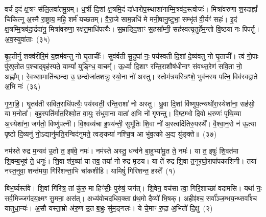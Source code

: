 वर्च॑ इ॒दं क्ष॒त्रꣳ स॑लि॒लवा॑तमु॒ग्रम्। ध॒र्त्री दि॒शां क्ष॒त्रमि॒दं दा॑धारोप॒स्थाशा॑नाम्मि॒त्रव॑द॒स्त्वोजः॑। मित्रा॑वरुणा श॒रदाह्नां᳚ चिकित्नू अ॒स्मै रा॒ष्ट्राय॒ महि॒ शर्म॑ यच्छतम्। वै॒रा॒जे साम॒न्नधि॑ मे मनी॒षानु॒ष्टुभा॒ सम्भृ॑तं वी॒र्यꣳ॑ सहः॑। इ॒दं क्ष॒त्रम्मि॒त्रव॑दा॒र्द्रदा॑नु॒ मित्रा॑वरुणा॒ रक्ष॑त॒माधि॑पत्यैः। स॒म्राड्दि॒शाꣳ स॒हसा᳚म्नी॒ सह॑स्वत्यृ॒तुर्\mbox{}हे॑म॒न्तो वि॒ष्ठया॑ नः पिपर्तु। अ॒व॒स्युवा॑ताः~(३५)

बृ॒ह॒तीर्नु शक्व॑रीरि॒मं य॒ज्ञम॑वन्तु नो घृ॒ताचीः᳚। सुव॑र्वती सु॒दुघा॑ नः॒ पय॑स्वती दि॒शां दे॒व्य॑वतु नो घृ॒ताची᳚। त्वं गो॒पाः पु॑रए॒तोत प॒श्चाद्बृह॑स्पते॒ याम्यां᳚ युङ्ग्धि॒ वाचम्᳚। ऊ॒र्ध्वा दि॒शाꣳ रन्ति॒राशौष॑धीनाꣳ संवथ्स॒रेण॑ सवि॒ता नो॒ अह्ना᳚म्। रे॒वथ्सामाति॑च्छन्दा उ॒ छन्दोजा॑तशत्रुः स्यो॒ना नो॑ अस्तु। स्तोम॑त्रयस्त्रिꣳशे॒ भुव॑नस्य पत्नि॒ विव॑स्वद्वाते अ॒भि नः॑~(३६)

गृ॒णा॒हि॒। घृ॒तव॑ती सवित॒राधि॑पत्यैः॒ पय॑स्वती॒ रन्ति॒राशा॑ नो अस्तु। ध्रु॒वा दि॒शां वि॑ष्णुप॒त्न्यघो॑रा॒स्येशा॑ना॒ सह॑सो॒ या म॒नोता᳚। बृह॒स्पति॑र्मात॒रिश्वो॒त वा॒युः सं॑धुवा॒ना वाता॑ अ॒भि नो॑ गृणन्तु। वि॒ष्ट॒म्भो दि॒वो ध॒रुणः॑ पृथि॒व्या अ॒स्येशा॑ना॒ जग॑तो॒ विष्णु॑पत्नी। वि॒श्वव्य॑चा इ॒षय॑न्ती॒ सुभू॑तिः शि॒वा नो॑ अ॒स्त्वदि॑तिरु॒पस्थे᳚। वै॒श्वा॒न॒रो न॑ ऊ॒त्या पृ॒ष्टो दि॒व्यनु॑ नो॒\-ऽद्यानु॑मति॒रन्विद॑नुमते॒ त्वङ्कया॑ नश्चि॒त्र आ भु॑व॒त्को अ॒द्य यु॑ङ्क्ते॥~(३७)

{\anuvakamend[{महि॑ सप्तद॒शेना॑व॒स्युवा॑ता अ॒भि नो\-ऽनु॑ न॒श्चतु॑र्दश च}]}%


{\anuvakamend[{नम॑स्ते रुद्र॒ नमो॒ हिर॑ण्यबाहवे॒ नमः॒ सह॑मानाय॒ नम॑ आव्या॒धिनी᳚भ्यो॒ नमो॑ भ॒वाय॒ नमो᳚ ज्ये॒ष्ठाय॒ नमो॑ दुन्दु॒भ्या॑य॒ नमः॒ सोमा॑य॒ नम॑ इरि॒ण्या॑य॒ द्रापे॑ स॒हस्रा॒ण्येका॑\-दश}]}%
{}

\setcounter{anuvakam}{0}
नम॑स्ते रुद्र म॒न्यव॑ उ॒तो त॒ इष॑वे॒ नमः॑। नम॑स्ते अस्तु॒ धन्व॑ने बा॒हुभ्या॑मु॒त ते॒ नमः॑। या त॒ इषुः॑ शि॒वत॑मा शि॒वम्ब॒भूव॑ ते॒ धनुः॑। शि॒वा श॑र॒व्या॑ या तव॒ तया॑ नो रुद्र मृडय। या ते॑ रुद्र शि॒वा त॒नूरघो॒रापा॑पकाशिनी। तया॑ नस्त॒नुवा॒ शन्त॑मया॒ गिरि॑शन्ता॒भि चा॑कशीहि। यामिषुं॑ गिरिशन्त॒ हस्ते᳚~(१)

बिभ॒र्ष्यस्त॑वे। शि॒वां गि॑रित्र॒ तां कु॑रु॒ मा हिꣳ॑सीः॒ पुरु॑षं॒ जग॑त्। शि॒वेन॒ वच॑सा त्वा॒ गिरि॒शाच्छा॑ वदामसि। यथा॑ नः॒ सर्व॒मिज्जग॑दय॒क्ष्मꣳ सु॒मना॒ अस॑त्। अध्य॑वोचदधिव॒क्ता प्र॑थ॒मो दैव्यो॑ भि॒षक्। अहीꣴ॑श्च॒ सर्वा᳚ञ्ज॒म्भय॒न्थ्सर्वा᳚श्च यातुधा॒न्यः॑। अ॒सौ यस्ता॒म्रो अ॑रु॒ण उ॒त ब॒भ्रुः सु॑म॒ङ्गलः॑। ये चे॒माꣳ रु॒द्रा अ॒भितो॑ दि॒क्षु~(२)

